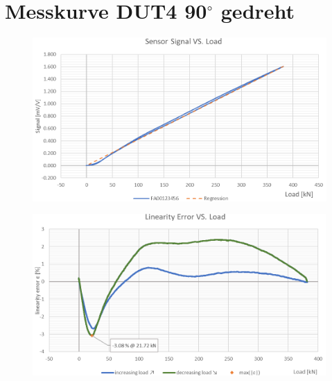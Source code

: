 \documentclass[12pt,a4paper]{article}
\begin{document}
	\section{Messkurve DUT4 90$^\circ$ gedreht }
\begin{figure}[H]
	\centering
	\includegraphics[width=.8\linewidth]{img/screenshot009}
	\label{fig:screenshot009}
\end{figure}
\begin{figure}[H]
	\centering
	\includegraphics[width=.8\linewidth]{img/screenshot010}
	\label{fig:screenshot010}
\end{figure}
	
\end{document}

